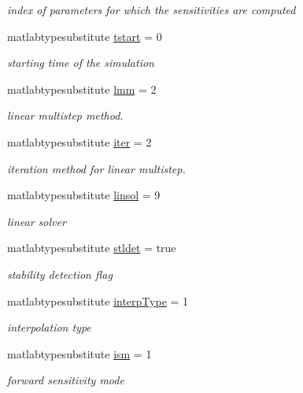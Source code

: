 \begin{DoxyCompactItemize}
\begin{DoxyCompactList}\small\item\em index of parameters for which the sensitivities are computed \end{DoxyCompactList}\item 
matlabtypesubstitute \mbox{\hyperlink{classamioption_a18a69d8713604897ca9ee705d9d4fc4a}{tstart}} = 0
\begin{DoxyCompactList}\small\item\em starting time of the simulation \end{DoxyCompactList}\item 
matlabtypesubstitute \mbox{\hyperlink{classamioption_a6f4b21b13e0c8c531c452c70b43fc96a}{lmm}} = 2
\begin{DoxyCompactList}\small\item\em linear multistep method. \end{DoxyCompactList}\item 
matlabtypesubstitute \mbox{\hyperlink{classamioption_a1fc3ae6bd5c6a80e9b81b27fc7b7a11a}{iter}} = 2
\begin{DoxyCompactList}\small\item\em iteration method for linear multistep. \end{DoxyCompactList}\item 
matlabtypesubstitute \mbox{\hyperlink{classamioption_a06749b49eaa313f4d00f0115d3a7a7f3}{linsol}} = 9
\begin{DoxyCompactList}\small\item\em linear solver \end{DoxyCompactList}\item 
matlabtypesubstitute \mbox{\hyperlink{classamioption_a202e02f7d8c1a87b1c675bcc1acf1c8e}{stldet}} = true
\begin{DoxyCompactList}\small\item\em stability detection flag \end{DoxyCompactList}\item 
matlabtypesubstitute \mbox{\hyperlink{classamioption_ad06cc805fa18b06ac937fd98a9eba0e7}{interp\+Type}} = 1
\begin{DoxyCompactList}\small\item\em interpolation type \end{DoxyCompactList}\item 
matlabtypesubstitute \mbox{\hyperlink{classamioption_aada9d6834569ad5c542cb8dc6b26ea46}{ism}} = 1
\begin{DoxyCompactList}\small\item\em forward sensitivity mode \end{DoxyCompactList}\item 

\end{DoxyCompactItemize}
